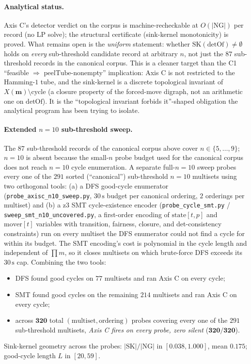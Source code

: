 \documentclass[11pt,a4paper]{article}
\theoremstyle{plain}
\theoremstyle{definition}
\newcommand{\SK}{\mathrm{SK}}
\newcommand{\detOf}{\mathrm{detOf}}
\newcommand{\peelTube}{\mathrm{peelTube}}
\begin{document}
\paragraph{Analytical status.}  Axis C's detector verdict on the
corpus is machine-recheckable at $O(|\mathrm{NG}|)$ per record (no
LP solve); the structural certificate (sink-kernel monotonicity) is
proved.  What remains open is the \emph{uniform} statement:
whether $\SK(\detOf) \ne \emptyset$ holds on \emph{every}
sub-threshold candidate record at arbitrary $n$, not just the $87$
sub-threshold records in the canonical corpus.  This is a cleaner target than the C1
``feasible $\Rightarrow$ $\peelTube$-nonempty'' implication:
Axis C is not restricted to the Hamming-$1$ tube, and the
sink-kernel is a discrete topological invariant of
$X(\mathbf{m}) \setminus \mathrm{cycle}$ (a closure property of the
forced-move digraph, not an arithmetic one on $\detOf$).  It is the
``topological invariant forbids it''-shaped obligation the
analytical program has been trying to isolate.

\paragraph{Extended $n = 10$ sub-threshold sweep.}  The $87$
sub-threshold records of the canonical corpus above cover
$n \in \{5, \ldots, 9\}$; $n = 10$ is absent because the
small-$n$ probe budget used for the canonical corpus does not
reach $n = 10$ cycle enumeration.  A separate full-$n = 10$ sweep
probes every one of the $291$ sorted (``canonical'') sub-threshold
$n = 10$ multisets using two orthogonal tools: (a) a DFS good-cycle
enumerator (\texttt{probe\_axisc\_n10\_sweep.py}, $30\,\mathrm{s}$
budget per canonical ordering, $2$ orderings per multiset) and
(b) a z3 SMT cycle-existence encoder
(\texttt{probe\_cycle\_smt.py} / \texttt{sweep\_smt\_n10\_uncovered.py},
a first-order encoding of $\mathrm{state}[t, p]$ and
$\mathrm{mover}[t]$ variables with transition, fairness, closure,
and det-consistency constraints) run on every multiset the DFS
enumerator could not find a cycle for within its budget.  The SMT
encoding's cost is polynomial in the cycle length and independent
of $\prod m$, so it closes multisets on which brute-force DFS
exceeds its $30\,\mathrm{s}$ cap.  Combining the two tools:
\begin{itemize}[leftmargin=*]
\item DFS found good cycles on $77$ multisets and ran Axis C on
every cycle;
\item SMT found good cycles on the remaining $214$ multisets and
ran Axis C on every cycle;
\item across $\mathbf{320}$ total
$(\mathrm{multiset}, \mathrm{ordering})$ probes covering every one
of the $291$ sub-threshold multisets,
\emph{Axis C fires on every probe, zero silent}
($\mathbf{320 / 320}$).
\end{itemize}
Sink-kernel geometry across the probes: $|\SK|/|\mathrm{NG}|$ in
$[0.038, 1.000]$, mean $0.175$; good-cycle length $L$ in
$[20, 59]$.
\end{document}

